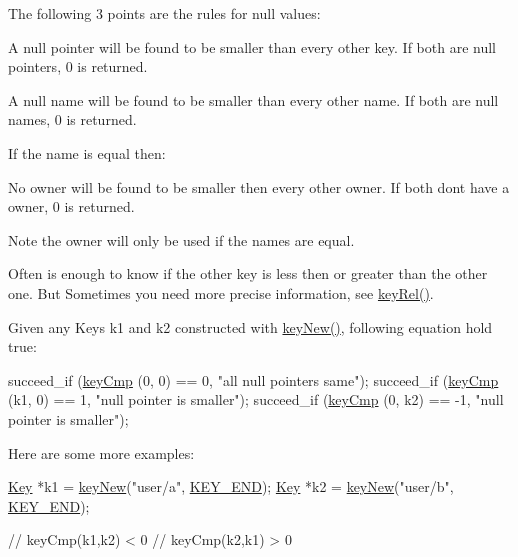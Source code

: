 The following 3 points are the rules for null values\+:


\begin{DoxyItemize}
\item A null pointer will be found to be smaller than every other key. If both are null pointers, 0 is returned.
\item A null name will be found to be smaller than every other name. If both are null names, 0 is returned.
\end{DoxyItemize}

If the name is equal then\+:


\begin{DoxyItemize}
\item No owner will be found to be smaller then every other owner. If both don\textquotesingle{}t have a owner, 0 is returned.
\end{DoxyItemize}

\begin{DoxyNote}{Note}
the owner will only be used if the names are equal.
\end{DoxyNote}
Often is enough to know if the other key is less then or greater than the other one. But Sometimes you need more precise information, see \hyperlink{group__keytest_ga6bb0f95ac34ce9c42d61bb35a76139d0}{key\+Rel()}.

Given any Keys k1 and k2 constructed with \hyperlink{group__key_gad23c65b44bf48d773759e1f9a4d43b89}{key\+New()}, following equation hold true\+:


\begin{DoxyCodeInclude}
        succeed\_if (\hyperlink{group__keytest_gaf6e66e12fe04d535a5d1c8218ced803e}{keyCmp} (0, 0) == 0, \textcolor{stringliteral}{"all null pointers same"});
        succeed\_if (\hyperlink{group__keytest_gaf6e66e12fe04d535a5d1c8218ced803e}{keyCmp} (k1, 0) == 1, \textcolor{stringliteral}{"null pointer is smaller"});
        succeed\_if (\hyperlink{group__keytest_gaf6e66e12fe04d535a5d1c8218ced803e}{keyCmp} (0, k2) == -1, \textcolor{stringliteral}{"null pointer is smaller"});
\end{DoxyCodeInclude}
 Here are some more examples\+: 
\begin{DoxyCode}
\hyperlink{classkdb_1_1Key_a5679f5cae63caddd64a60388b9cc77fa}{Key} *k1 = \hyperlink{group__key_gad23c65b44bf48d773759e1f9a4d43b89}{keyNew}(\textcolor{stringliteral}{"user/a"}, \hyperlink{group__key_gga91fb3178848bd682000958089abbaf40aa8adb6fcb92dec58fb19410eacfdd403}{KEY\_END});
\hyperlink{classkdb_1_1Key_a5679f5cae63caddd64a60388b9cc77fa}{Key} *k2 = \hyperlink{group__key_gad23c65b44bf48d773759e1f9a4d43b89}{keyNew}(\textcolor{stringliteral}{"user/b"}, \hyperlink{group__key_gga91fb3178848bd682000958089abbaf40aa8adb6fcb92dec58fb19410eacfdd403}{KEY\_END});

\textcolor{comment}{// keyCmp(k1,k2) < 0}
\textcolor{comment}{// keyCmp(k2,k1) > 0}
\end{DoxyCode}


